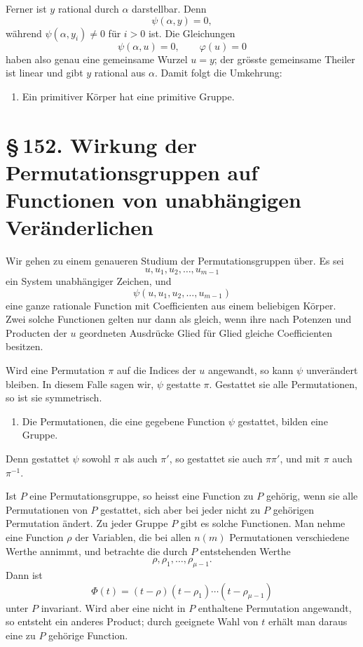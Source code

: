 \documentclass[11pt]{article}
\providecommand{\sect}[2]{\section*{\S\,#1. #2}}
\begin{document}
Ferner ist $y$ rational durch $\alpha$ darstellbar. Denn
\[
        \psi(\alpha,y)=0,
\tag{12}
\]
während $\psi(\alpha,y_i)\ne0$ für $i>0$ ist. Die Gleichungen
\[
        \psi(\alpha,u)=0,
        \qquad
        \varphi(u)=0
\tag{13}
\]
haben also genau eine gemeinsame Wurzel $u=y$; der grösste gemeinsame Theiler ist linear und gibt $y$ rational aus $\alpha$. Damit folgt die Umkehrung:
\begin{enumerate}[label=\arabic*.,leftmargin=2em,start=3]
\item Ein primitiver Körper hat eine primitive Gruppe.
\end{enumerate}

\sect{152}{Wirkung der Permutationsgruppen auf Functionen von unabhängigen Veränderlichen}

Wir gehen zu einem genaueren Studium der Permutationsgruppen über. Es sei
\[
        u,u_1,u_2,\ldots,u_{m-1}
\tag{1}
\]
ein System unabhängiger Zeichen, und
\[
        \psi(u,u_1,u_2,\ldots,u_{m-1})
\tag{2}
\]
eine ganze rationale Function mit Coefficienten aus einem beliebigen Körper. Zwei solche Functionen gelten nur dann als gleich, wenn ihre nach Potenzen und Producten der $u$ geordneten Ausdrücke Glied für Glied gleiche Coefficienten besitzen.

Wird eine Permutation $\pi$ auf die Indices der $u$ angewandt, so kann $\psi$ unverändert bleiben. In diesem Falle sagen wir, $\psi$ gestatte $\pi$. Gestattet sie alle Permutationen, so ist sie symmetrisch.

\begin{enumerate}[label=\arabic*.,leftmargin=2em]
\item Die Permutationen, die eine gegebene Function $\psi$ gestattet, bilden eine Gruppe.
\end{enumerate}

Denn gestattet $\psi$ sowohl $\pi$ als auch $\pi'$, so gestattet sie auch $\pi\pi'$, und mit $\pi$ auch $\pi^{-1}$.

Ist $P$ eine Permutationsgruppe, so heisst eine Function zu $P$ gehörig, wenn sie alle Permutationen von $P$ gestattet, sich aber bei jeder nicht zu $P$ gehörigen Permutation ändert. Zu jeder Gruppe $P$ gibt es solche Functionen. Man nehme eine Function $\rho$ der Variablen, die bei allen $n(m)$ Permutationen verschiedene Werthe annimmt, und betrachte die durch $P$ entstehenden Werthe
\[
        \rho,\rho_1,
\ldots,\rho_{
\mu-1}.
\tag{1}
\]
Dann ist
\[
        \Phi(t)=(t-\rho)(t-\rho_1)\cdots(t-\rho_{
\mu-1})
\tag{2}
\]
unter $P$ invariant. Wird aber eine nicht in $P$ enthaltene Permutation angewandt, so entsteht ein anderes Product; durch geeignete Wahl von $t$ erhält man daraus eine zu $P$ gehörige Function.
\end{document}
